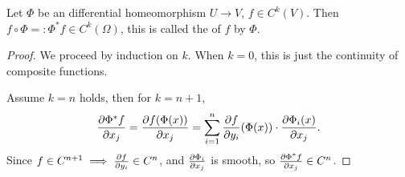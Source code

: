 \begin{theorem}
    Let $\Phi$ be an differential homeomorphism $U\to V$, $f\in C^k(V)$.
	Then $f \circ \Phi =: \Phi^* f\in C^k(\Omega)$, this is called
	the  of $f$ by $\Phi$.
\end{theorem}
\begin{proof}[Proof]
    We proceed by induction on $k$.
	When $k = 0$, this is just the continuity of composite functions.

	Assume $k = n$ holds, then for $k = n+1$,
	\[
	\frac{\partial \Phi^*f}{\partial x_j} = \frac{\partial f(\Phi(x))}{\partial x_j}
	= \sum_{i=1}^{n} \frac{\partial f}{\partial y_i}(\Phi(x)) \cdot \frac{\partial \Phi_i(x)}{\partial x_j}.
	\]
	Since $f \in C^{n+1}\implies \frac{\partial f}{\partial y_i}\in C^n$,
	and $\frac{\partial \Phi_i}{\partial x_j}$ is smooth, so $\frac{\partial \Phi^*f}{\partial x_j}\in C^n$.
\end{proof}

